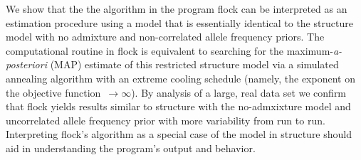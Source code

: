 
      We show that the the algorithm in the program {\sc flock} \citep{Duc&Tur2009} can be
interpreted as an estimation procedure using  
a model that is essentially identical to the {\sc structure} 
\citep{Pritchardetal2000} model with no admixture and non-correlated 
allele frequency priors. The computational routine in {\sc flock} is 
equivalent to searching for the maximum-{\em a-posteriori} (MAP) 
estimate of this restricted {\sc structure} model via a simulated 
annealing algorithm with an extreme cooling 
schedule (namely, the exponent on the objective function~$\rightarrow \infty$).  By analysis of a large, real data set we
confirm that {\sc flock} yields results similar to {\sc structure} with the no-admxixture
model and uncorrelated allele frequency prior with more variability 
from run to run. Interpreting {\sc flock}'s algorithm as a special case of the model in 
{\sc structure} should aid in  understanding the program's output and behavior. 
